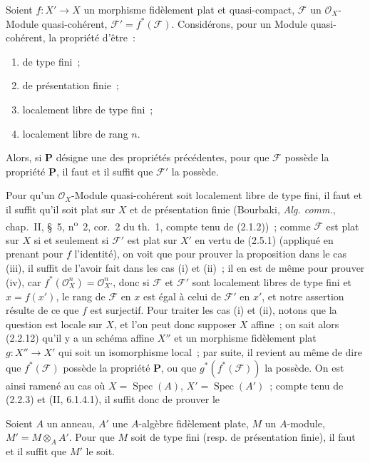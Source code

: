 \begin{proposition}[2.5.2]
\label{IV.2.5.2-fr}
Soient $f:X'\to X$ un morphisme fidèlement plat et quasi-compact,
$\mathscr F$ un $\mathcal O_X$-Module quasi-cohérent,
$\mathscr F'=f^*(\mathscr F)$. Considérons, pour un Module quasi-cohérent, la
propriété d'être~:
\begin{enumerate}
\item[(i)] de type fini~;
\item[(ii)] de présentation finie~;
\item[(iii)] localement libre de type fini~;
\item[(iv)] localement libre de rang $n$.
\end{enumerate}
Alors, si $\mathbf P$ désigne une des propriétés précédentes, pour que
$\mathscr F$ possède la propriété $\mathbf P$, il faut et il suffit que
$\mathscr F'$ la possède.
\end{proposition}

Pour qu'un $\mathcal O_X$-Module quasi-cohérent soit localement libre de type
fini, il faut et il suffit qu'il soit plat sur $X$ et de présentation finie
(Bourbaki, \emph{Alg. comm.}, chap.~II, \S~5, n\textsuperscript{o}~2,
cor.~2 du th.~1, compte tenu de (2.1.2))~; comme $\mathscr F$ est plat sur
$X$ si et seulement si $\mathscr F'$ est plat sur $X'$ en vertu de (2.5.1)
(appliqué en prenant pour $f$ l'identité), on voit que pour prouver la
proposition dans le cas (iii), il suffit de l'avoir fait dans les cas (i) et
(ii)~; il en est de même pour prouver (iv), car
$f^*(\mathcal O_X^n)=\mathcal O_{X'}^n$, donc si $\mathscr F$ et
$\mathscr F'$ sont localement libres de type fini et $x=f(x')$, le rang de
$\mathscr F$ en $x$ est égal à celui de $\mathscr F'$ en $x'$, et notre
assertion résulte de ce que $f$ est surjectif. Pour traiter les cas (i) et
(ii),
notons que la question est locale sur $X$, et l'on peut donc supposer $X$
affine~; on sait alors (2.2.12) qu'il y a un schéma affine $X''$ et un
morphisme fidèlement plat $g:X''\to X'$ qui soit un isomorphisme local~; par
suite, il revient au même de dire que $f^*(\mathscr F)$ possède la propriété
$\mathbf P$, ou que $g^*(f^*(\mathscr F))$ la possède. On est ainsi ramené au
cas où $X=\operatorname{Spec}(A)$, $X'=\operatorname{Spec}(A')$~; compte tenu
de (2.2.3) et (II, 6.1.4.1), il suffit donc de prouver le

\begin{lemma}[2.5.3]
\label{IV.2.5.3-fr}
Soient $A$ un anneau, $A'$ une $A$-algèbre fidèlement plate, $M$ un
$A$-module, $M'=M\otimes_A A'$. Pour que $M$ soit de type fini (resp. de
présentation finie), il faut et il suffit que $M'$ le soit.
\end{lemma}

